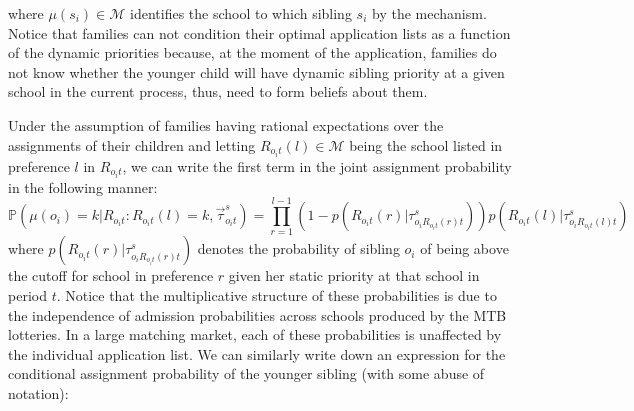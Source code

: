 \documentclass{article}
\begin{document}
where $\mu(s_i)\in \mathcal{M}$ identifies the school to which sibling $s_i$ by the mechanism. Notice that families can not condition their optimal application lists as a function of the dynamic priorities because, at the moment of the application, families do not know whether the younger child will have dynamic sibling priority at a given school in the current process, thus, need to form beliefs about them.  

Under the assumption of families having rational expectations over the assignments of their children and letting $R_{o_i t}\left( l \right)\in \mathcal{M}$ being the school listed in preference $l$ in $R_{o_i t}$, we can write the first term in the joint assignment probability in the following manner:
\begin{equation}
\mathbb{P} \left( \mu(o_i) = k | R_{o_i t}: R_{o_i t}\left( l \right) = k, \vec{\tau}^{s}_{o_it} \right) = \prod_{r=1}^{l-1} \left(1-p\left(R_{o_it}(r)| \tau^{s}_{o_iR_{o_it}(r)t}\right)\right) p\left(R_{o_it}(l)| \tau^{s}_{o_iR_{o_it}(l)t}\right)
\end{equation}
where $p\left(R_{o_it}(r)| \tau^{s}_{o_iR_{o_it}(r)t}\right)$ denotes the probability of sibling $o_i$ of being above the cutoff for school in preference $r$ given her static priority at that school in period $t$. Notice that the multiplicative structure of these probabilities is due to the independence of admission probabilities across schools produced by the MTB lotteries. In a large matching market, each of these probabilities is unaffected by the individual application list. We can similarly write down an expression for the conditional assignment probability of the younger sibling (with some abuse of notation): 
\end{document}
